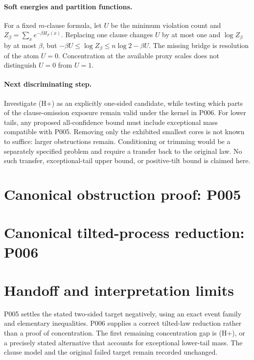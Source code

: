 \documentclass[11pt,a4paper]{article}
\begin{document}
\paragraph{Soft energies and partition functions.}
For a fixed $m$-clause formula, let $U$ be the minimum violation count and
$Z_\beta=\sum_x e^{-\beta H_F(x)}$.
Replacing one clause changes $U$ by at most one and $\log Z_\beta$ by
at most $\beta$, but
$-\beta U\le\log Z_\beta\le n\log2-\beta U$.
The missing bridge is resolution of the atom $U=0$. Concentration at
the available proxy scales does not distinguish $U=0$ from $U=1$.

\paragraph{Next discriminating step.}
Investigate (H+) as an explicitly one-sided candidate, while testing
which parts of the clause-omission exposure remain valid under the
kernel in P006. For lower tails, any proposed all-confidence bound
must include exceptional mass compatible with P005. Removing only
the exhibited smallest cores is not known to suffice: larger
obstructions remain. Conditioning or trimming would be a separately
specified problem and require a transfer back to the original law.
No such transfer, exceptional-tail upper bound, or positive-tilt
bound is claimed here.

\bigskip
\section{Canonical obstruction proof: P005}
\label{sec:canonical-obstruction}


\bigskip
\section{Canonical tilted-process reduction: P006}
\label{sec:canonical-tilt}


\section{Handoff and interpretation limits}
P005 settles the stated two-sided target negatively, using an exact
event family and elementary inequalities. P006 supplies a correct
tilted-law reduction rather than a proof of concentration. The first
remaining concentration gap is (H+), or a precisely stated alternative
that accounts for exceptional lower-tail mass. The clause model and
the original failed target remain recorded unchanged.
\end{document}
